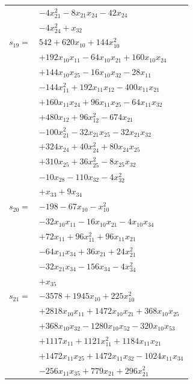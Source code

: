 \begin{longtable}{@{}r@{\;}l@{}}
 & \(\displaystyle -4x_{21}^{2} -8x_{21}x_{24} -42x_{24}\) \\
 & \(\displaystyle -4x_{24}^{2} +x_{32}\) \\[3pt]
\(s_{19}=\) & \(\displaystyle 542 +620x_{10} +144x_{10}^{2}\) \\
 & \(\displaystyle +192x_{10}x_{11} -64x_{10}x_{21} +160x_{10}x_{24}\) \\
 & \(\displaystyle +144x_{10}x_{25} -16x_{10}x_{32} -28x_{11}\) \\
 & \(\displaystyle -144x_{11}^{2} +192x_{11}x_{12} -400x_{11}x_{21}\) \\
 & \(\displaystyle +160x_{11}x_{24} +96x_{11}x_{25} -64x_{11}x_{32}\) \\
 & \(\displaystyle +480x_{12} +96x_{12}^{2} -674x_{21}\) \\
 & \(\displaystyle -100x_{21}^{2} -32x_{21}x_{25} -32x_{21}x_{32}\) \\
 & \(\displaystyle +324x_{24} +40x_{24}^{2} +80x_{24}x_{25}\) \\
 & \(\displaystyle +310x_{25} +36x_{25}^{2} -8x_{25}x_{32}\) \\
 & \(\displaystyle -10x_{28} -110x_{32} -4x_{32}^{2}\) \\
 & \(\displaystyle +x_{33} +9x_{34}\) \\[3pt]
\(s_{20}=\) & \(\displaystyle -198 -67x_{10} -x_{10}^{2}\) \\
 & \(\displaystyle -32x_{10}x_{11} -16x_{10}x_{21} -4x_{10}x_{34}\) \\
 & \(\displaystyle +72x_{11} +96x_{11}^{2} +96x_{11}x_{21}\) \\
 & \(\displaystyle -64x_{11}x_{34} +36x_{21} +24x_{21}^{2}\) \\
 & \(\displaystyle -32x_{21}x_{34} -156x_{34} -4x_{34}^{2}\) \\
 & \(\displaystyle +x_{35}\) \\[3pt]
\(s_{21}=\) & \(\displaystyle -3578 +1945x_{10} +225x_{10}^{2}\) \\
 & \(\displaystyle +2818x_{10}x_{11} +1472x_{10}x_{21} +368x_{10}x_{25}\) \\
 & \(\displaystyle +368x_{10}x_{32} -1280x_{10}x_{52} -320x_{10}x_{53}\) \\
 & \(\displaystyle +1117x_{11} +1121x_{11}^{2} +1184x_{11}x_{21}\) \\
 & \(\displaystyle +1472x_{11}x_{25} +1472x_{11}x_{32} -1024x_{11}x_{34}\) \\
 & \(\displaystyle -256x_{11}x_{35} +779x_{21} +296x_{21}^{2}\) \\

\end{longtable}
